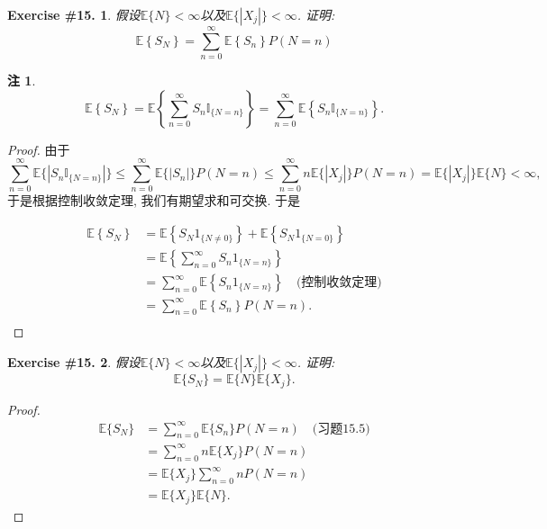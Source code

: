 \documentclass[UTF8, a4paper]{article}
\newtheorem{exercise}{Exercise \#15.}
\newtheorem*{remark}{注}
\begin{document}


\begin{framed}
\begin{exercise}
假设\(\mathbb{E}\{N\} < \infty\)以及\(\mathbb{E}\{|X_j|\} < \infty\).
证明: 
$$
\mathbb{E}\left\{S_N\right\}=\sum_{n=0}^{\infty} \mathbb{E}\left\{S_n\right\} P(N=n)
$$
\end{exercise}

\begin{remark}
$$
\mathbb{E}\left\{S_N\right\}=\mathbb{E}\left\{\sum_{n=0}^{\infty} S_n \mathbb{I}_{\{N=n\}}\right\}=\sum_{n=0}^{\infty} \mathbb{E}\left\{S_n \mathbb{I}_{\{N=n\}}\right\}.
$$
\end{remark}
\end{framed}

\begin{proof}
由于
$$
\sum_{n=0}^{\infty} \mathbb{E}\{|S_n \mathbb{I}_{\{N=n\}}|\} \leq \sum_{n=0}^{\infty} \mathbb{E}\{|S_n|\} P(N = n) \leq \sum_{n=0}^{\infty} n\mathbb{E}\{|X_j|\} P(N = n) = \mathbb{E}\{|X_j|\} \mathbb{E}\{N\}< \infty,
$$
于是根据控制收敛定理, 我们有期望求和可交换. 于是

\begin{align*}
    \mathbb{E}\left\{S_N\right\} &= \mathbb{E}\left\{S_N 1_{\{N \neq 0\}}\right\} + \mathbb{E}\left\{S_N 1_{\{N = 0\}}\right\} \\
    &=  \mathbb{E}\left\{\sum_{n=0}^{\infty} S_n 1_{\{N = n\}}\right\} \\
    &= \sum_{n=0}^{\infty} \mathbb{E}\left\{S_n 1_{\{N = n\}}\right\} \quad \text{(控制收敛定理)}\\
    &= \sum_{n=0}^{\infty} \mathbb{E}\left\{S_n\right\} P(N=n). \\
\end{align*}
\end{proof}


\begin{framed}
\begin{exercise}
假设\(\mathbb{E}\{N\} < \infty\)以及\(\mathbb{E}\{|X_j|\} < \infty\).
证明: 
$$
\mathbb{E}\{S_N\} = \mathbb{E}\{N\}\mathbb{E}\{X_j\}.
$$
\end{exercise}
\end{framed}

\begin{proof}
\begin{align*}
    \mathbb{E}\{S_N\} &= \sum_{n=0}^{\infty} \mathbb{E}\{S_n\} P(N=n) \quad \text{(习题15.5)}\\
    &= \sum_{n=0}^{\infty} n\mathbb{E}\{X_j\} P(N=n) \\
    &= \mathbb{E}\{X_j\} \sum_{n=0}^{\infty} n P(N=n) \\
    &= \mathbb{E}\{X_j\} \mathbb{E}\{N\}.
\end{align*}
\end{proof}
\end{document}
